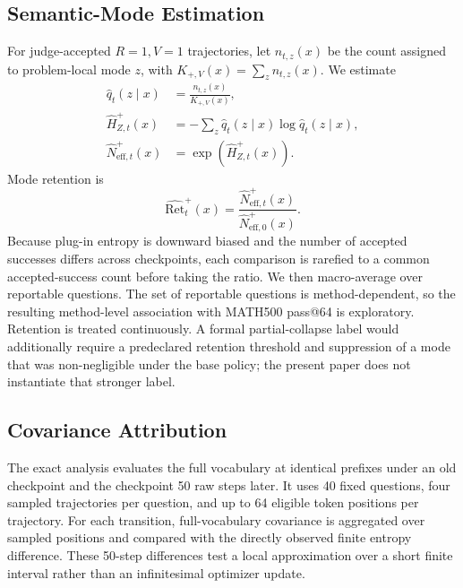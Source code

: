 \documentclass[letterpaper]{article}
\begin{document}
\subsection{Semantic-Mode Estimation}

For judge-accepted \(R=1,V=1\) trajectories, let \(n_{t,z}(x)\) be the count
assigned to problem-local mode \(z\), with
\(K_{+,V}(x)=\sum_z n_{t,z}(x)\).  We estimate
\begin{equation}
\begin{aligned}
\widehat q_t(z\mid x)&=\frac{n_{t,z}(x)}{K_{+,V}(x)},\\
\widehat H^+_{Z,t}(x)
&=-\sum_z\widehat q_t(z\mid x)\log\widehat q_t(z\mid x),\\
\widehat N^+_{\mathrm{eff},t}(x)
&=\exp\!\left(\widehat H^+_{Z,t}(x)\right).
\end{aligned}
\label{eq:sup-mode-estimator}
\end{equation}
Mode retention is
\begin{equation}
\widehat{\mathrm{Ret}}^+_t(x)
=\frac{\widehat N^+_{\mathrm{eff},t}(x)}
       {\widehat N^+_{\mathrm{eff},0}(x)}.
\label{eq:sup-mode-retention}
\end{equation}
Because plug-in entropy is downward biased and the number of accepted
successes differs across checkpoints, each comparison is rarefied to a common
accepted-success count before taking the ratio.  We then macro-average over
reportable questions.  The set of reportable questions is method-dependent,
so the resulting method-level association with MATH500 pass@64 is
exploratory.  Retention is treated continuously.  A formal partial-collapse
label would additionally require a predeclared retention threshold and
suppression of a mode that was non-negligible under the base policy; the
present paper does not instantiate that stronger label.

\subsection{Covariance Attribution}

The exact analysis evaluates the full vocabulary at identical prefixes under
an old checkpoint and the checkpoint 50 raw steps later.  It uses 40 fixed
questions, four sampled trajectories per question, and up to 64 eligible token
positions per trajectory.  For each transition, full-vocabulary covariance is
aggregated over sampled positions and compared with the directly observed
finite entropy difference.  These 50-step differences test a local
approximation over a short finite interval rather than an infinitesimal
optimizer update.
\end{document}
